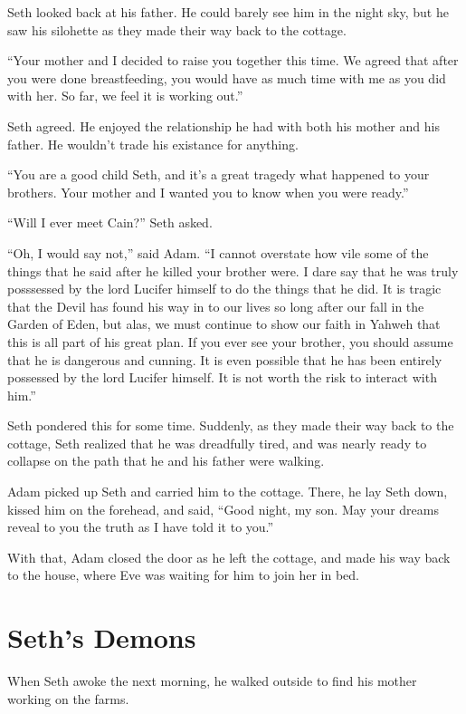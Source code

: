\documentclass[12pt,twoside,titlepage]{report}
\begin{document}
Seth looked back at his father. He could barely see him in the night
sky, but he saw his silohette as they made their way back to the
cottage.

``Your mother and I decided to raise you together this time. We agreed
that after you were done breastfeeding, you would have as much time with
me as you did with her. So far, we feel it is working out.''

Seth agreed. He enjoyed the relationship he had with both his mother and
his father. He wouldn't trade his existance for anything.

``You are a good child Seth, and it's a great tragedy what happened to
your brothers. Your mother and I wanted you to know when you were
ready.''

``Will I ever meet Cain?'' Seth asked.

``Oh, I would say not,'' said Adam. ``I cannot overstate how vile some
of the things that he said after he killed your brother were. I dare say
that he was truly posssessed by the lord Lucifer himself to do the
things that he did. It is tragic that the Devil has found his way in to
our lives so long after our fall in the Garden of Eden, but alas, we
must continue to show our faith in Yahweh that this is all part of his
great plan. If you ever see your brother, you should assume that he is
dangerous and cunning. It is even possible that he has been entirely
possessed by the lord Lucifer himself. It is not worth the risk to
interact with him.''

Seth pondered this for some time. Suddenly, as they made their way back
to the cottage, Seth realized that he was dreadfully tired, and was
nearly ready to collapse on the path that he and his father were
walking.

Adam picked up Seth and carried him to the cottage. There, he lay Seth
down, kissed him on the forehead, and said, ``Good night, my son. May
your dreams reveal to you the truth as I have told it to you.''

With that, Adam closed the door as he left the cottage, and made his way
back to the house, where Eve was waiting for him to join her in bed.

\hypertarget{seths-demons}{%
\chapter{Seth's Demons}\label{seths-demons}}

When Seth awoke the next morning, he walked outside to find his mother
working on the farms.
\end{document}
